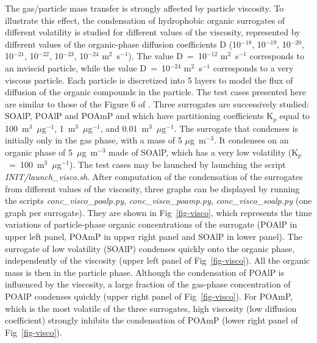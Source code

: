 \documentclass[a4paper,11pt]{article}
\begin{document}
{{The gas/particle mass transfer is strongly affected by particle viscosity. To
illustrate this effect, the condensation of hydrophobic organic surrogates of different volatility is studied for different
values of the viscosity, represented by different values of the organic-phase
diffusion coefficients D (10$^{-18}$, 10$^{-19}$, 10$^{-20}$,
10$^{-21}$, 10$^{-22}$, 10$^{-23}$, 10$^{-24}$ m$^2$~s$^{-1}$). The value
D~=~10$^{-12}$ m$^2$~s$^{-1}$ corresponds to an inviscid particle, while the value
D~=~10$^{-24}$ m$^2$~s$^{-1}$ corresponds to a very viscous particle.
Each particle is discretized into 5 layers to model the flux of diffusion of the
organic compounds in the particle. 
The test cases presented here are similar to those of the Figure 6 of \cite{couvidat2015}. 
Three surrogates are successively studied: SOAlP, POAlP and POAmP and  which have 
 partitioning coefficients K$_p$ equal to 100~m$^3$~$\mu$g$^{-1}$,
 1~m$^3$~$\mu$g$^{-1}$, and 0.01~m$^3$~$\mu$g$^{-1}$.
The surrogate that condenses is initially only in the gas
phase, with a mass of 5 $\mu$g~m$^{-3}$. It condenses on an organic phase of
5~$\mu$g~m$^{-3}$ made of SOAlP, which has a very low volatility (K$_p$~=~100~m$^3$~$\mu$g$^{-1}$).
The test cases may be launched by launching the script
 {\it{INIT/launch\_visco.sh}}. After computation of the condensation of the surrogates
from different values of the viscosity, three graphs can be displayed by
running the scripts {\it{conc\_visco\_poalp.py}}, {\it{conc\_visco\_poamp.py}},
{\it{conc\_visco\_soalp.py}} (one graph per surrogate). They are shown in 
Fig~\ref{fig-visco}, which represents the time variations of particle-phase organic
concentrations of the surrogate (POAlP in upper left panel, POAmP in upper
right panel and SOAlP in lower panel). 
The surrogate of low volatility (SOAlP) condenses quickly onto the organic
phase, independently of the viscosity (upper left panel of Fig~\ref{fig-visco}). All the organic mass is then in the
particle phase.  
Although the condensation of POAlP is influenced by the viscosity, a large fraction of the gas-phase concentration of POAlP condenses quickly (upper right panel of Fig~\ref{fig-visco}).
For POAmP, which is the most volatile of the three surrogates, high viscosity
(low diffusion coefficient) strongly inhibits the condensation of POAmP (lower right panel of Fig~\ref{fig-visco}).

}}
\end{document}
